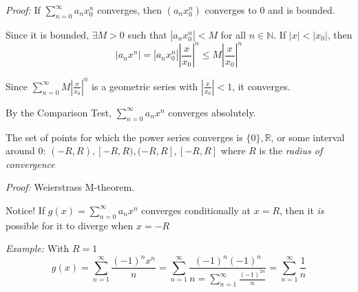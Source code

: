\documentclass[12pt]{report}
\newcommand{\R}{\mathbb{R}}
\newcommand{\N}{\mathbb{N}}
\newcommand{\abs}[1]{\left\vert #1 \right\vert}
\newenvironment*{tbox}[2][gray]{
    \begin{tcolorbox}[
        parbox=false,
        colback=#1!5!white,
        colframe=#1!75!black,
        breakable,
        title={#2}
    ]}
    {\end{tcolorbox}}
\begin{document}
        \begin{tbox}{\textbf{Theorem:} If a power series $\sum_{n=0}^{\infty} a_nx^n$ converges at some point $x_0 \in \R$, then it converges absolutely for all $x$ with $\abs{x} < \abs{x_0}$}
            \emph{Proof:} If $\sum_{n=0}^{\infty} a_n x_0^n$ converges, then $(a_n x_0^n)$ converges to 0 and is bounded. 

            Since it is bounded, $\exists M > 0$ such that $\abs{a_n x_0^n} < M$ for all $n \in \N$. If $\abs{x} < \abs{x_0}$, then 
            \[\abs{a_n x^n} = \abs{a_n x_0^n} \abs{\frac{x}{x_0}}^n \leq M \abs{\frac{x}{x_0}}^n \]
            
            Since $\sum_{n=0}^{\infty} M \abs{\frac{x}{x_0}}^n$ is a geometric series with $\abs{\frac{x}{x_0}} < 1$, it converges. 
            
            By the Comparison Test, $\sum_{n=0}^{\infty} a_n x^n$ converges absolutely.
        \end{tbox}

        The set of points for which the power series converges is $\{0\}, \R$, or some interval around $0$: $(-R, R), [-R, R), (-R, R], [-R, R]$ where $R$ is the \emph{radius of convergence}

        \begin{tbox}{\textbf{Theorem:} If a power series $\sum_{n=0}^{\infty} a_n x^n$ converges absolutely at a point $x_0$, then it converges uniformly on the closed interval $[-c, c]$ where $c = \abs{x_0}$.}
            \emph{Proof:} Weierstrass M-theorem.
        \end{tbox}

        Notice! If $g(x) = \sum_{n=0}^{\infty} a_n x^n$ converges conditionally at $x = R$, then it \emph{is} possible for it to diverge when $x = -R$
         
        \emph{Example:} With $R = 1$ 
        \[g(x) = \sum_{n=1}^{\infty} \frac{(-1)^n x^n}{n} = \sum_{n=1}^{\infty} \frac{(-1)^n (-1)^n}{n = \sum_{n=1}^{\infty} \frac{(-1)^{2n}}{n}} = \sum_{n=1}^{\infty} \frac{1}{n}\]
\end{document}
